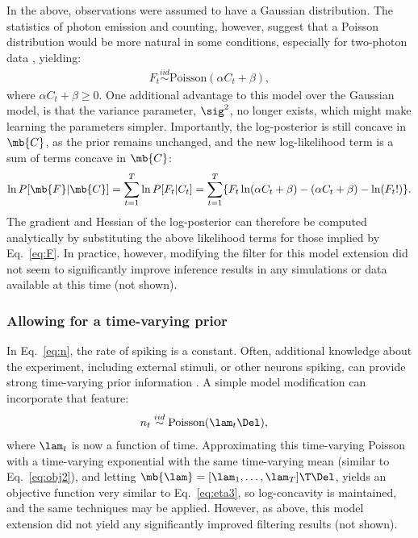 In the above, observations were assumed to have a Gaussian distribution.  The statistics of photon emission and counting, however, suggest that a Poisson distribution would be more natural in some conditions, especially for two-photon data \cite{SjulsonMiesenbock07}, yielding:
\begin{align} \label{eq:poiss}
	F_t \overset{iid}{\sim}\text{Poisson}(\alpha C_t + \beta),
\end{align}
where $\alpha C_t + \beta \geq 0$. One additional advantage to this model over the Gaussian model, is that the variance parameter, $\sig^2$, no longer exists, which might make learning the parameters simpler.  Importantly, the log-posterior is still concave in $\mb{C}$, as
the prior remains unchanged, and the new log-likelihood term is a sum of terms concave in $\mb{C}$:
\begin{align}
	\ln P[\mb{F} | \mb{C}] = \sum_{t=1}^T \ln P[F_t | C_t ] = \sum_{t=1}^T \{F_t \ln (\alpha C_t + \beta) -(\alpha C_t + \beta) - \ln(F_t !)\}.
\end{align}
The gradient and Hessian of the log-posterior can therefore be computed analytically by substituting the above likelihood terms for those implied by Eq.~\eqref{eq:F}.  In practice, however, modifying the filter for this model extension did not seem to significantly improve inference results in any simulations or data available at this time (not shown).

\subsubsection{Allowing for a time-varying prior}

In Eq.~\eqref{eq:n}, the rate of spiking is a constant.  Often, additional knowledge about the experiment, including external stimuli, or other neurons spiking, can provide strong time-varying prior information \cite{VogelsteinPaninski09}.  A simple model modification can incorporate that feature:
\begin{align}
	n_t &\overset{iid}{\sim} \text{Poisson}(\lam_t \Del),
\end{align}
where $\lam_t$ is now a function of time.  Approximating this time-varying Poisson with a time-varying exponential with the same time-varying mean (similar to Eq.~\eqref{eq:obj2}), and letting $\mb{\lam} = [\lam_1, \ldots, \lam_T]\T \Del$, yields an objective function very similar to Eq.~\eqref{eq:eta3}, so log-concavity is maintained, and the same techniques may be applied.  However, as above, this model extension did not yield any significantly improved filtering results (not shown).

